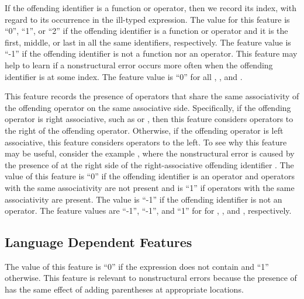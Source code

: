 \documentclass[12pt]{report}	%
\begin{document}
If the offending identifier is a function or operator, then
we record its index, with regard to its occurrence in the ill-typed expression. 
The value for this feature is ``0'', ``1'', or ``2'' if the 
offending identifier is a function or operator and it is
the first, middle, or last in all the same identifiers, respectively.
The feature value is ``-1'' if 
the offending identifier is not a function nor an
operator.
%
This feature may help to learn if a nonstructural error occurs more often
when the offending identifier is at some index.
The feature value is ``0'' for
all , , and .


%
This feature records the presence of operators 
that share the same associativity of the offending operator
on the same associative side. Specifically, if the
offending operator is right associative, such as
\prog{++} or \prog{:}, then this feature 
considers operators to the right of the offending
operator. Otherwise, if the offending operator is
left associative, this feature considers operators
to the left. 
%
To see why this feature may be useful, consider
the example , where the 
nonstructural error is caused
by the presence of \prog{:} at the right
side of the right-associative 
offending identifier \prog{++}.
%
The value of this feature is 
``0'' if the offending identifier is an
operator and operators with the same associativity
are not present and is ``1'' if operators with the same associativity
are present. The value is ``-1'' if the offending identifier
is not an operator. 
The feature values are ``-1'', ``-1'', and ``1'' for 
for , , and ,
respectively.

\subsection{Language Dependent Features}
\label{sec:feature-vector:lang}

%
The value of this feature is ``0'' if the expression
does not contain \prog{\$} and ``1'' otherwise. This feature
is relevant to nonstructural errors
because the presence of \prog{\$} has the
same effect of adding parentheses at appropriate locations.
\end{document}
